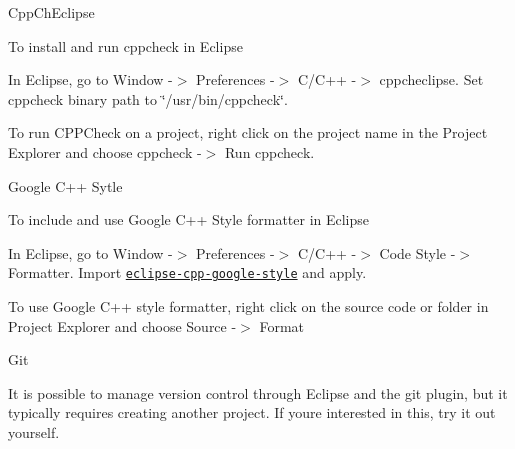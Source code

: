 \begin{DoxyItemize}
\item Cpp\+Ch\+Eclipse

To install and run cppcheck in Eclipse
\begin{DoxyEnumerate}
\item In Eclipse, go to Window -\/$>$ Preferences -\/$>$ C/\+C++ -\/$>$ cppcheclipse. Set cppcheck binary path to \char`\"{}/usr/bin/cppcheck\char`\"{}.
\item To run C\+P\+P\+Check on a project, right click on the project name in the Project Explorer and choose cppcheck -\/$>$ Run cppcheck.
\end{DoxyEnumerate}
\item Google C++ Sytle

To include and use Google C++ Style formatter in Eclipse
\begin{DoxyEnumerate}
\item In Eclipse, go to Window -\/$>$ Preferences -\/$>$ C/\+C++ -\/$>$ Code Style -\/$>$ Formatter. Import \href{https://raw.githubusercontent.com/google/styleguide/gh-pages/eclipse-cpp-google-style.xml}{\tt eclipse-\/cpp-\/google-\/style} and apply.
\item To use Google C++ style formatter, right click on the source code or folder in Project Explorer and choose Source -\/$>$ Format
\end{DoxyEnumerate}
\item Git

It is possible to manage version control through Eclipse and the git plugin, but it typically requires creating another project. If you\textquotesingle{}re interested in this, try it out yourself. 
\end{DoxyItemize}